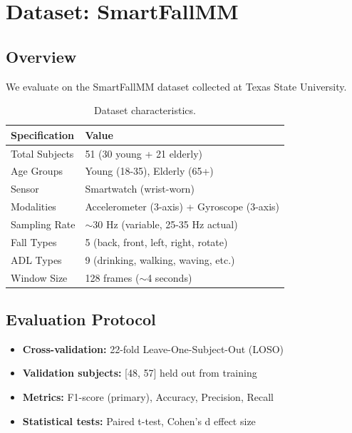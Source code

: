 \documentclass{article}
\begin{document}
\section{Dataset: SmartFallMM}

\subsection{Overview}

We evaluate on the SmartFallMM dataset collected at Texas State University.

\begin{table}[htbp]
    \centering
    \caption{Dataset characteristics.}
    \label{tab:dataset}
    \begin{tabular}{ll}
        \toprule
        \textbf{Specification} & \textbf{Value} \\
        \midrule
        Total Subjects & 51 (30 young + 21 elderly) \\
        Age Groups & Young (18-35), Elderly (65+) \\
        Sensor & Smartwatch (wrist-worn) \\
        Modalities & Accelerometer (3-axis) + Gyroscope (3-axis) \\
        Sampling Rate & $\sim$30 Hz (variable, 25-35 Hz actual) \\
        Fall Types & 5 (back, front, left, right, rotate) \\
        ADL Types & 9 (drinking, walking, waving, etc.) \\
        Window Size & 128 frames ($\sim$4 seconds) \\
        \bottomrule
    \end{tabular}
\end{table}

\subsection{Evaluation Protocol}

\begin{itemize}
    \item \textbf{Cross-validation:} 22-fold Leave-One-Subject-Out (LOSO)
    \item \textbf{Validation subjects:} [48, 57] held out from training
    \item \textbf{Metrics:} F1-score (primary), Accuracy, Precision, Recall
    \item \textbf{Statistical tests:} Paired t-test, Cohen's d effect size
\end{itemize}
\end{document}
